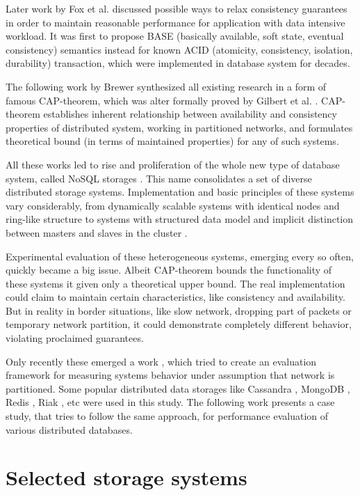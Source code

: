\documentclass[a4paper]{article}
\begin{document}
Later work by Fox et al. \cite{fox1997cluster} discussed possible ways to relax consistency guarantees in order to maintain reasonable performance for application with data intensive workload. 
It was first to propose BASE (basically available, soft state, eventual consistency) semantics instead for known ACID (atomicity, consistency, isolation, durability) transaction, which were implemented in database system for decades.

The following work by Brewer \cite{brewer2000towards} synthesized all existing research in a form of famous CAP-theorem, which was alter formally proved by Gilbert et al. \cite{gilbert2002brewer}.
CAP-theorem establishes inherent relationship between availability and consistency properties of distributed system, working in partitioned networks, and formulates theoretical bound (in terms of maintained properties) for any of such systems.

All these works led to rise and proliferation of the whole new type of database system, called NoSQL storages \cite{strauch2011nosql}.
This name consolidates a set of diverse distributed storage systems. 
Implementation and basic principles of these systems vary considerably, from dynamically scalable systems with identical nodes and ring-like structure \cite{decandia2007dynamo} to systems with structured data model and implicit distinction between masters and slaves in the cluster \cite{chang2008bigtable}.

Experimental evaluation of these heterogeneous systems, emerging every so often, quickly became a big issue.
Albeit CAP-theorem bounds the functionality of these systems it given only a theoretical upper bound.
The real implementation could claim to maintain certain characteristics, like consistency and availability.
But in reality in border situations, like slow network, dropping part of packets or temporary network partition, it could demonstrate completely different behavior, violating proclaimed guarantees.

Only recently these emerged a work \cite{jepsen}, which tried to create an evaluation framework for measuring systems behavior under assumption that network is partitioned.
Some popular distributed data storages like Cassandra \cite{lakshman2010cassandra}, MongoDB \cite{mongo}, Redis \cite{redis}, Riak \cite{riak}, etc were used in this study.
The following work presents a case study, that tries to follow the same approach, for performance evaluation of various distributed databases.

\section{Selected storage systems}
\label{sec:candidates}
\end{document}
